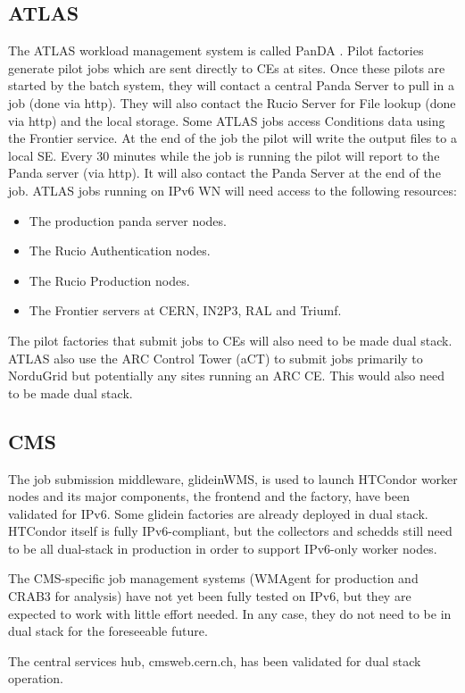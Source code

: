\documentclass[11pt]{article}
\begin{document}
\subsection{ATLAS}
The ATLAS workload management system is called PanDA \cite{Panda}.  Pilot factories generate pilot jobs which are sent directly to CEs at sites.  Once these pilots are started by the batch system, they will contact a central Panda Server to pull in a job (done via http).  They will also contact the Rucio Server for File lookup (done via http) and the local storage.  Some ATLAS jobs access Conditions data using the Frontier service.  At the end of the job the pilot will write the output files to a local SE.  Every 30 minutes while the job is running the pilot will report to the Panda server (via http).  It will also contact the Panda Server at the end of the job.  ATLAS jobs running on IPv6 WN will need access to the following resources:
\begin{itemize}
\item The production panda server nodes.
\item The Rucio Authentication nodes.
\item The Rucio Production nodes.
\item The Frontier servers at CERN, IN2P3, RAL and Triumf.
\end{itemize}  
The pilot factories that submit jobs to CEs will also need to be made dual stack.  ATLAS also use the ARC Control Tower (aCT) to submit jobs primarily to NorduGrid but potentially any sites running an ARC CE.  This would also need to be made dual stack.


\subsection{CMS}
The job submission middleware, glideinWMS, is used to launch HTCondor worker nodes and its major components, the frontend and the factory,
have been validated for IPv6. Some glidein factories are already deployed in dual stack. HTCondor itself is fully IPv6-compliant, but the collectors and schedds still need to be all dual-stack in production in order to support IPv6-only worker nodes.

The CMS-specific job management systems (WMAgent for production and CRAB3 for analysis) have not yet been fully tested on IPv6, but they are expected to work with little effort needed. In any case, they do not need to be in dual stack for the foreseeable future.

The central services hub, cmsweb.cern.ch, has been validated for dual stack operation.
\end{document}
